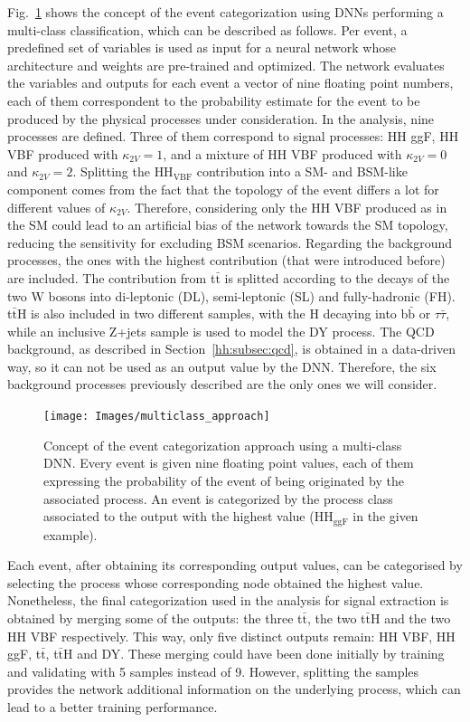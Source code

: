 \documentclass[../main.tex]{subfiles}
\begin{document}
Fig.~\ref{fig:hh:multi_approach} shows the concept of the event categorization using DNNs performing a multi-class classification, which can be described as follows. Per event, a predefined set of variables is used as input for a neural network whose architecture and weights are pre-trained and optimized. The network evaluates the variables and outputs for each event a vector of nine floating point numbers, each of them correspondent to the probability estimate for the event to be produced by the physical processes under consideration. In the \hhbbtt{} analysis, nine processes are defined. Three of them correspond to signal processes: HH ggF, HH VBF produced with $\kappa_{2V}=1$, and a mixture of HH VBF produced with $\kappa_{2V}=0$ and $\kappa_{2V}=2$. Splitting the $\text{HH}_{\text{VBF}}$ contribution into a SM- and BSM-like component comes from the fact that the topology of the event differs a lot for different values of $\kappa_{2V}$. Therefore, considering only the HH VBF produced as in the SM could lead to an artificial bias of the network towards the SM topology, reducing the sensitivity for excluding BSM scenarios. Regarding the background processes, the ones with the highest contribution (that were introduced before) are included. The contribution from t$\bar{\text{t}}$ is splitted according to the decays of the two W bosons into di-leptonic (DL), semi-leptonic (SL) and fully-hadronic (FH). t$\bar{\text{t}}$H is also included in two different samples, with the H decaying into b$\bar{\text{b}}$ or $\tau\bar{\tau}$, while an inclusive Z+jets sample is used to model the DY process. The QCD background, as described in Section~\ref{hh:subsec:qcd}, is obtained in a data-driven way, so it can not be used as an output value by the DNN. Therefore, the six background processes previously described are the only ones we will consider.


\begin{figure}[h!]
\texttt{[image: Images/multiclass\_approach]}
\caption[Event categorization using a multi-class DNN]{Concept of the event categorization approach using a multi-class DNN. Every event is given nine floating point values, each of them expressing the probability of the event of being originated by the associated process. An event is categorized by the process class associated to the output with the highest value ($\text{HH}_{\text{ggF}}$ in the given example).}
\label{fig:hh:multi_approach}
\end{figure}

Each event, after obtaining its corresponding output values, can be categorised by selecting the process whose corresponding node obtained the highest value. Nonetheless, the final categorization used in the analysis for signal extraction is obtained by merging some of the outputs: the three t$\bar{\text{t}}$, the two t$\bar{\text{t}}$H and the two HH VBF respectively. This way, only five distinct outputs remain: HH VBF, HH ggF, t$\bar{\text{t}}$, t$\bar{\text{t}}$H and DY. These merging could have been done initially by training and validating with 5 samples instead of 9. However, splitting the samples provides the network additional information on the underlying process, which can lead to a better training performance.
\end{document}
